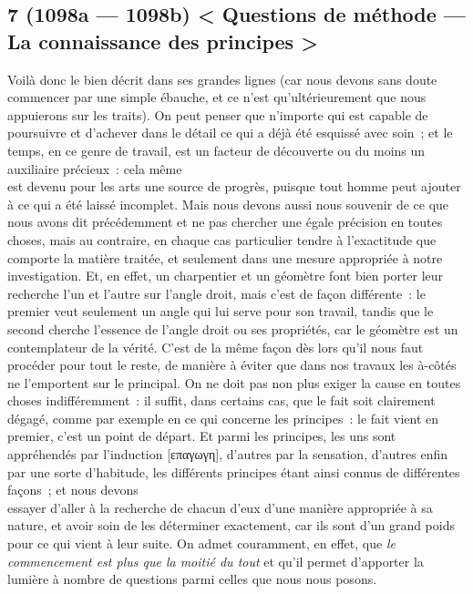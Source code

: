 \documentclass[french,twoside]{book} %
\begin{document}
\subsection[{7 (1098a — 1098b) < Questions de méthode — La connaissance des principes >}]{7 (1098a — 1098b) < Questions de méthode — La connaissance des principes >}
\noindent Voilà donc le bien décrit dans ses grandes lignes (car nous devons sans doute commencer par une simple ébauche, et ce n’est qu’ultérieurement que nous appuierons sur les traits). On peut penser que n’importe qui est capable de poursuivre et d’achever dans le détail ce qui a déjà été esquissé avec soin ; et le temps, en ce genre de travail, est un facteur de découverte ou du moins un auxiliaire précieux : cela même \\
est devenu pour les arts une source de progrès, puisque tout homme peut ajouter à ce qui a été laissé incomplet. Mais nous devons aussi nous souvenir de ce que nous avons dit précédemment et ne pas chercher une égale précision en toutes choses, mais au contraire, en chaque cas particulier tendre à l’exactitude que comporte la matière traitée, et seulement dans une mesure appropriée à notre investigation. Et, en effet, un charpentier et un géomètre font bien porter leur recherche l’un et l’autre sur l’angle droit, mais c’est de façon différente : le \\
premier veut seulement un angle qui lui serve pour son travail, tandis que le second cherche l’essence de l’angle droit ou ses propriétés, car le géomètre est un contemplateur de la vérité. C’est de la même façon dès lors qu’il nous faut procéder pour tout le reste, de manière à éviter que dans nos travaux les à-côtés ne l’emportent sur le principal. On ne doit pas non plus exiger la cause en toutes choses indifféremment : il suffit,  dans certains cas, que le fait soit clairement dégagé, comme par exemple en ce qui concerne les principes : le fait vient en premier, c’est un point de départ. Et parmi les principes, les uns sont appréhendés par l’induction [επαγωγη], d’autres par la sensation, d’autres enfin par une sorte d’habitude, les différents principes étant ainsi connus de différentes façons ; et nous devons \\
essayer d’aller à la recherche de chacun d’eux d’une manière appropriée à sa nature, et avoir soin de les déterminer exactement, car ils sont d’un grand poids pour ce qui vient à leur suite. On admet couramment, en effet, que {\itshape le commencement est plus que la moitié du tout} et qu’il permet d’apporter la lumière à nombre de questions parmi celles que nous nous posons.
\end{document}

